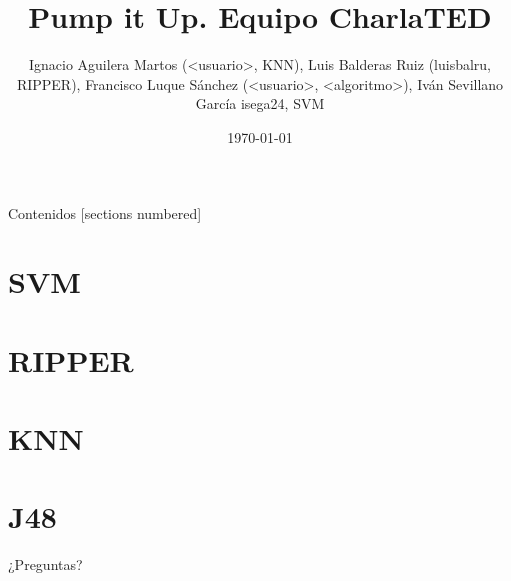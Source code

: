 \documentclass[10pt]{beamer}
\title{Pump it Up. Equipo CharlaTED}
\author{Ignacio Aguilera Martos (<usuario>, KNN), Luis Balderas Ruiz (luisbalru, RIPPER), Francisco Luque Sánchez (<usuario>, <algoritmo>), Iván Sevillano García isega24, SVM}
\date{\today}
\institute{Preprocesamiento y Clasificación}
\begin{document}
\maketitle

\begin{frame}[fragile]{Contenidos}
[sections numbered]
\tableofcontents[hideallsubsections]
\end{frame}

\section{SVM}


\section{RIPPER}


\section{KNN}


\section{J48}



\begin{frame}[standout]
\LARGE{¿Preguntas?}
\vspace{10px}

\end{frame}
\end{document}
